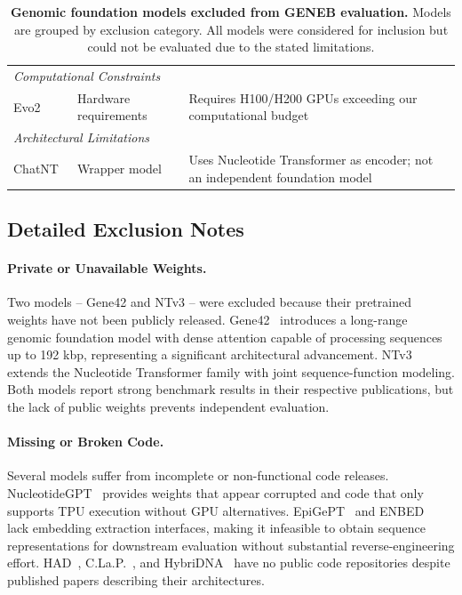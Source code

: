 \documentclass{llmxive}
\begin{document}
\begin{table}[h]
\begin{tabular}{llp{7cm}}
\midrule
\multicolumn{3}{l}{\textit{Computational Constraints}} \\
Evo2~\cite{evo2} & Hardware requirements & Requires H100/H200 GPUs exceeding our computational budget \\
\midrule
\multicolumn{3}{l}{\textit{Architectural Limitations}} \\
ChatNT~\cite{chatnt} & Wrapper model & Uses Nucleotide Transformer as encoder; not an independent foundation model \\
\bottomrule
\end{tabular}
\caption{\textbf{Genomic foundation models excluded from GENEB evaluation.} Models are grouped by exclusion category. All models were considered for inclusion but could not be evaluated due to the stated limitations.}
\label{tab:excluded_models}
\end{table}

\subsection{Detailed Exclusion Notes}

\paragraph{Private or Unavailable Weights.}
Two models -- Gene42 and NTv3 -- were excluded because their pretrained weights have not been publicly released. Gene42~\cite{gene42} introduces a long-range genomic foundation model with dense attention capable of processing sequences up to 192 kbp, representing a significant architectural advancement. NTv3~\cite{ntv3} extends the Nucleotide Transformer family with joint sequence-function modeling. Both models report strong benchmark results in their respective publications, but the lack of public weights prevents independent evaluation.

\paragraph{Missing or Broken Code.}
Several models suffer from incomplete or non-functional code releases. NucleotideGPT~\cite{nucleotidegpt} provides weights that appear corrupted and code that only supports TPU execution without GPU alternatives. EpiGePT~\cite{epigept} and ENBED~\cite{enbed} lack embedding extraction interfaces, making it infeasible to obtain sequence representations for downstream evaluation without substantial reverse-engineering effort. HAD~\cite{had}, C.La.P.~\cite{clap}, and HybriDNA~\cite{hybridna} have no public code repositories despite published papers describing their architectures.
\end{document}
